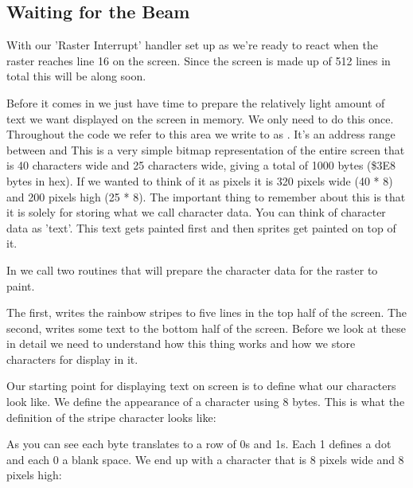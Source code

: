 \subsection{Waiting for the Beam}
With our 'Raster Interrupt' handler set up as  we're ready to 
react when the raster reaches line 16 on the screen. Since the screen is made up of 512 lines in
total this will be along soon.

Before it comes in we just have time to prepare the relatively light amount of text we want displayed
on the screen in memory. We only need to do this once. Throughout the code we refer to this
area we write to as . It's an address range between  and  This is a very
simple bitmap representation of the entire screen that is 40 characters wide and 25 characters wide,
giving a total of 1000 bytes (\$3E8 bytes in hex). If we wanted to think of it as pixels it is 320 pixels wide (40 * 8)
and 200 pixels high (25 * 8). The important thing to remember about this  is that it is solely
for storing what we call character data. You can think of character data as 'text'. This text gets painted
first and then sprites get painted on top of it.

In  we call two routines that will prepare the character data for the raster to paint. 

The first,  writes the rainbow stripes to five lines in the top half of the screen. 
The second,  writes some text to the bottom half of the screen. Before we look at these
in detail we need to understand how this thing  works and how we store characters for display in it.

Our starting point for displaying text on screen is to define what our characters look like. We define the appearance
of a character using 8 bytes. This is what the definition of the stripe character looks like: 

%


As you can see each byte translates to a row of 0s and 1s. Each 1 defines a dot and each 0 a blank space. We end up
with a character that is 8 pixels wide and 8 pixels high:



